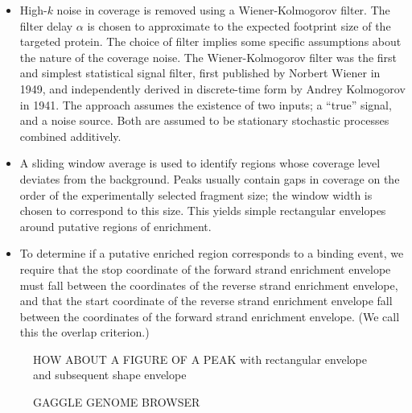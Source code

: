 \documentclass{bioinfo}
\begin{document}
\begin{methods}
\begin{itemize}
\item High-$k$ noise in coverage is removed using a Wiener-Kolmogorov
  filter. The filter delay $\alpha$ is chosen to approximate to the
  expected footprint size of the targeted protein. The choice of
  filter implies some specific assumptions about the nature of the
  coverage noise. The Wiener-Kolmogorov filter was the first and
  simplest statistical signal filter, first published by Norbert
  Wiener in 1949, and independently derived in discrete-time form by
  Andrey Kolmogorov in 1941. The approach assumes the existence of two
  inputs; a ``true'' signal, and a noise source. Both are assumed to
  be stationary stochastic processes combined additively.

\item A sliding window average is used to identify regions whose
  coverage level deviates from the background. Peaks usually contain
  gaps in coverage on the order of the experimentally selected
  fragment size; the window width is chosen to correspond to this
  size. This yields simple rectangular envelopes around putative
  regions of enrichment. 

\item To determine if a putative enriched region corresponds to a
  binding event, we require that the stop coordinate of the forward
  strand enrichment envelope must fall between the coordinates of the
  reverse strand enrichment envelope, and that the start coordinate of
  the reverse strand enrichment envelope fall between the coordinates
  of the forward strand enrichment envelope. (We call this the overlap
  criterion.)

\end{itemize}


\end{methods}

\begin{figure}[!tfbd peak - a nice one]%
  \caption{HOW ABOUT A FIGURE OF A PEAK with rectangular envelope and
    subsequent shape envelope}\label{fig:01}
\end{figure}

\begin{figure}[!tfbd data - reasonable spot showing curation]%
\caption{GAGGLE GENOME BROWSER}\label{fig:02}
\end{figure}
\end{document}
